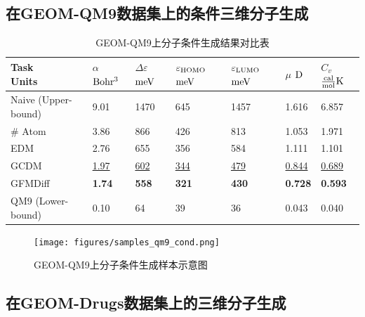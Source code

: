 \subsection{在GEOM-QM9数据集上的条件三维分子生成}

\begin{table}[H]
    \centering
    \caption{GEOM-QM9上分子条件生成结果对比表}
    \label{tab:exp_qm9_condition}
    \begin{tabular}{lllllll}
    \hline
    \makecell[l]{Task\\Units} & \makecell[l]{$\alpha$\\${\rm Bohr^3}$} & \makecell[l]{$\Delta \varepsilon$\\${\rm meV}$} & \makecell[l]{$\varepsilon_{{\rm HOMO}}$\\${\rm meV}$} & \makecell[l]{$\varepsilon_{{\rm LUMO}}$\\${\rm meV}$} & \makecell[l]{$\mu$\\${\rm D}$} & \makecell[l]{$C_v$\\$\frac{{\rm cal}}{{\rm mol}}{\rm K}$} \\
    \hline
    Naive (Upper-bound) & 9.01 & 1470 & 645 & 1457 & 1.616 & 6.857 \\
    \# Atom & 3.86 & 866 & 426 & 813 & 1.053 & 1.971 \\
    EDM & 2.76 & 655 & 356 & 584 & 1.111 & 1.101 \\
    GCDM & \underline{1.97} & \underline{602} & \underline{344} & \underline{479} & \underline{0.844} & \underline{0.689} \\
    GFMDiff & \textbf{1.74} & \textbf{558} & \textbf{321} & \textbf{430} & \textbf{0.728} & \textbf{0.593} \\
    QM9 (Lower-bound) & 0.10 & 64 & 39 & 36 & 0.043 & 0.040 \\
    \hline
    \end{tabular}
\end{table}
\begin{figure}[H]
    \centering
    \texttt{[image: figures/samples\_qm9\_cond.png]}
    \caption{GEOM-QM9上分子条件生成样本示意图}
    \label{fig:samples_qm9_cond}
\end{figure}


\subsection{在GEOM-Drugs数据集上的三维分子生成}

